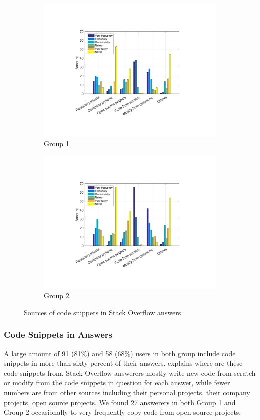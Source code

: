 \documentclass[10pt,journal,compsoc]{IEEEtran}
\begin{document}
\begin{figure}
	\begin{subfigure}{.5\textwidth}
		\centering
		\includegraphics[width=.8\linewidth]{survey_snippet_source_1}
		\caption{Group 1}
		\label{fig:survey_snippet_source_1}
	\end{subfigure}%
	\begin{subfigure}{.5\textwidth}
		\centering
		\includegraphics[width=.8\linewidth]{survey_snippet_source_2}
		\caption{Group 2}
		\label{fig:survey_snippet_source_2}
	\end{subfigure}
	\caption{Sources of code snippets in Stack Overflow answers}
	\label{fig:survey_snippet_source}
\end{figure}

\subsubsection{Code Snippets in Answers} 
A large amount of 91 (81\%) and 58
(68\%) users in both group include code snippets in more than sixty percent of
their answers.  explains where are these code
snippets from. Stack Overflow answerers mostly write new code from scratch 
or modify from the code snippets in question for each answer, while 
fewer numbers are from other sources including their personal projects, 
their company projects, open source projects. We found 27 answerers in both Group 1
and Group 2 occasionally to very frequently copy code from open source projects.
\end{document}
